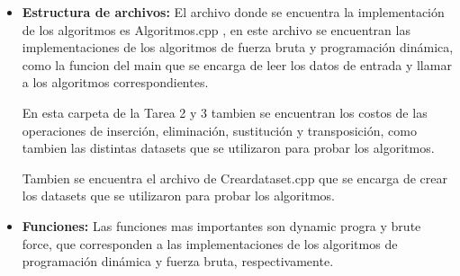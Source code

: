 \begin{itemize}
    \item \textbf{Estructura de archivos:} El archivo donde se encuentra la implementación de los algoritmos es
    Algoritmos.cpp , en este archivo se encuentran las implementaciones de los algoritmos de fuerza bruta y programación dinámica,
    como la funcion del main que se encarga de leer los datos de entrada y llamar a los algoritmos correspondientes.


    En esta carpeta de la Tarea 2 y 3 tambien se encuentran los costos de las operaciones de inserción, eliminación, 
    sustitución y transposición, como tambien las distintas datasets que se utilizaron para probar los algoritmos.


    Tambien se encuentra el archivo de Creardataset.cpp que se encarga de crear los datasets que se utilizaron para probar
    los algoritmos.
    \item \textbf{Funciones:} Las funciones mas importantes son dynamic progra y brute force, que corresponden a 
    las implementaciones de los algoritmos de programación dinámica y fuerza bruta, respectivamente.
\end{itemize}
